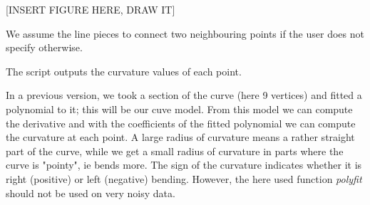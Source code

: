 [INSERT FIGURE HERE, DRAW IT]


We assume the line pieces to connect two neighbouring points if the user does not specify otherwise. 

The script outputs the curvature values of each point. 




In a previous version, we  took a section of the curve (here 9 vertices) and fitted a polynomial to it; this will be our cuve model. From this model we can compute the derivative and with the coefficients of the fitted polynomial we can compute the curvature at each point. 
A large radius of curvature means a rather straight part of the curve, while we get a small radius of curvature in parts where the curve is "pointy", ie bends more. The sign of the curvature indicates whether it is right (positive) or left (negative) bending. However, the here used function \textit{polyfit} should not be used on very noisy data.








%
% 
%
%


